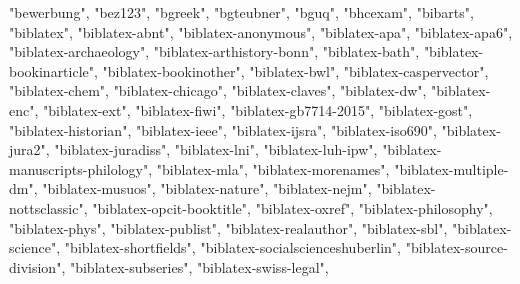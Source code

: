 \documentclass[
]{article}
\newenvironment{Shaded}{\begin{snugshade}}{\end{snugshade}}
\newcommand{\NormalTok}[1]{#1}
\newcommand{\StringTok}[1]{\textcolor[rgb]{0.31,0.60,0.02}{#1}}
\begin{document}
\begin{Shaded}
\begin{Highlighting}[]
\StringTok{"bewerbung"}\NormalTok{, }\StringTok{"bez123"}\NormalTok{, }\StringTok{"bgreek"}\NormalTok{, }\StringTok{"bgteubner"}\NormalTok{, }\StringTok{"bguq"}\NormalTok{, }\StringTok{"bhcexam"}\NormalTok{, }
\StringTok{"bibarts"}\NormalTok{, }\StringTok{"biblatex"}\NormalTok{, }\StringTok{"biblatex{-}abnt"}\NormalTok{, }\StringTok{"biblatex{-}anonymous"}\NormalTok{, }
\StringTok{"biblatex{-}apa"}\NormalTok{, }\StringTok{"biblatex{-}apa6"}\NormalTok{, }\StringTok{"biblatex{-}archaeology"}\NormalTok{, }\StringTok{"biblatex{-}arthistory{-}bonn"}\NormalTok{, }
\StringTok{"biblatex{-}bath"}\NormalTok{, }\StringTok{"biblatex{-}bookinarticle"}\NormalTok{, }\StringTok{"biblatex{-}bookinother"}\NormalTok{, }
\StringTok{"biblatex{-}bwl"}\NormalTok{, }\StringTok{"biblatex{-}caspervector"}\NormalTok{, }\StringTok{"biblatex{-}chem"}\NormalTok{, }\StringTok{"biblatex{-}chicago"}\NormalTok{, }
\StringTok{"biblatex{-}claves"}\NormalTok{, }\StringTok{"biblatex{-}dw"}\NormalTok{, }\StringTok{"biblatex{-}enc"}\NormalTok{, }\StringTok{"biblatex{-}ext"}\NormalTok{, }
\StringTok{"biblatex{-}fiwi"}\NormalTok{, }\StringTok{"biblatex{-}gb7714{-}2015"}\NormalTok{, }\StringTok{"biblatex{-}gost"}\NormalTok{, }\StringTok{"biblatex{-}historian"}\NormalTok{, }
\StringTok{"biblatex{-}ieee"}\NormalTok{, }\StringTok{"biblatex{-}ijsra"}\NormalTok{, }\StringTok{"biblatex{-}iso690"}\NormalTok{, }\StringTok{"biblatex{-}jura2"}\NormalTok{, }
\StringTok{"biblatex{-}juradiss"}\NormalTok{, }\StringTok{"biblatex{-}lni"}\NormalTok{, }\StringTok{"biblatex{-}luh{-}ipw"}\NormalTok{, }\StringTok{"biblatex{-}manuscripts{-}philology"}\NormalTok{, }
\StringTok{"biblatex{-}mla"}\NormalTok{, }\StringTok{"biblatex{-}morenames"}\NormalTok{, }\StringTok{"biblatex{-}multiple{-}dm"}\NormalTok{, }
\StringTok{"biblatex{-}musuos"}\NormalTok{, }\StringTok{"biblatex{-}nature"}\NormalTok{, }\StringTok{"biblatex{-}nejm"}\NormalTok{, }\StringTok{"biblatex{-}nottsclassic"}\NormalTok{, }
\StringTok{"biblatex{-}opcit{-}booktitle"}\NormalTok{, }\StringTok{"biblatex{-}oxref"}\NormalTok{, }\StringTok{"biblatex{-}philosophy"}\NormalTok{, }
\StringTok{"biblatex{-}phys"}\NormalTok{, }\StringTok{"biblatex{-}publist"}\NormalTok{, }\StringTok{"biblatex{-}realauthor"}\NormalTok{, }\StringTok{"biblatex{-}sbl"}\NormalTok{, }
\StringTok{"biblatex{-}science"}\NormalTok{, }\StringTok{"biblatex{-}shortfields"}\NormalTok{, }\StringTok{"biblatex{-}socialscienceshuberlin"}\NormalTok{, }
\StringTok{"biblatex{-}source{-}division"}\NormalTok{, }\StringTok{"biblatex{-}subseries"}\NormalTok{, }\StringTok{"biblatex{-}swiss{-}legal"}\NormalTok{, }

\end{Highlighting}
\end{Shaded}
\end{document}
